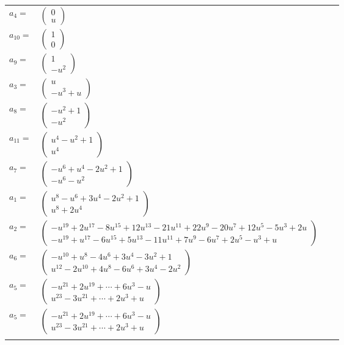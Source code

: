 \documentclass[1p]{elsarticle_modified}
\theoremstyle{definition}
\begin{document}
\begin{tabular}{m{7pt} m{180pt} m{7pt} m{180pt} }
\flushright $a_{4}=$&$\begin{pmatrix}0\\u\end{pmatrix}$ \\
\flushright $a_{10}=$&$\begin{pmatrix}1\\0\end{pmatrix}$ \\
\flushright $a_{9}=$&$\begin{pmatrix}1\\- u^2\end{pmatrix}$ \\
\flushright $a_{3}=$&$\begin{pmatrix}u\\- u^3+u\end{pmatrix}$ \\
\flushright $a_{8}=$&$\begin{pmatrix}- u^2+1\\- u^2\end{pmatrix}$ \\
\flushright $a_{11}=$&$\begin{pmatrix}u^4- u^2+1\\u^4\end{pmatrix}$ \\
\flushright $a_{7}=$&$\begin{pmatrix}- u^6+u^4-2 u^2+1\\- u^6- u^2\end{pmatrix}$ \\
\flushright $a_{1}=$&$\begin{pmatrix}u^8- u^6+3 u^4-2 u^2+1\\u^8+2 u^4\end{pmatrix}$ \\
\flushright $a_{2}=$&$\begin{pmatrix}- u^{19}+2 u^{17}-8 u^{15}+12 u^{13}-21 u^{11}+22 u^9-20 u^7+12 u^5-5 u^3+2 u\\- u^{19}+u^{17}-6 u^{15}+5 u^{13}-11 u^{11}+7 u^9-6 u^7+2 u^5- u^3+u\end{pmatrix}$ \\
\flushright $a_{6}=$&$\begin{pmatrix}- u^{10}+u^8-4 u^6+3 u^4-3 u^2+1\\u^{12}-2 u^{10}+4 u^8-6 u^6+3 u^4-2 u^2\end{pmatrix}$ \\
\flushright $a_{5}=$&$\begin{pmatrix}- u^{21}+2 u^{19}+\cdots+6 u^3- u\\u^{23}-3 u^{21}+\cdots+2 u^3+u\end{pmatrix}$\\ \flushright $a_{5}=$&$\begin{pmatrix}- u^{21}+2 u^{19}+\cdots+6 u^3- u\\u^{23}-3 u^{21}+\cdots+2 u^3+u\end{pmatrix}$\\&\end{tabular}
\end{document}
